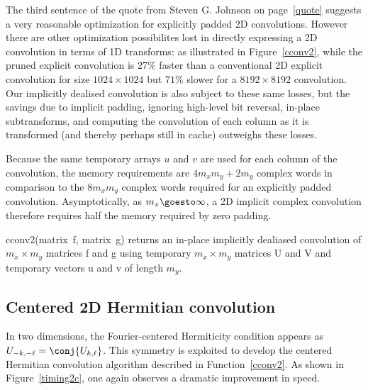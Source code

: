 \documentclass[final]{siamltex}
\begin{document}
The third sentence of the quote from Steven G. Johnson
on page~\ref{quote} suggests a very reasonable optimization
for explicitly padded 2D convolutions.
However there are other optimization possibilites lost in directly
expressing a 2D convolution in terms of 1D transforms: as illustrated in
Figure~\ref{cconv2}, while the pruned explicit convolution is 27\% faster
than a conventional 2D explicit convolution for size $1024\times 1024$ but
$71\%$ slower for a $8192\times 8192$ convolution. Our implicitly dealised
convolution is also subject to these same losses, but the savings due to
implicit padding, ignoring high-level bit reversal, in-place subtransforms, 
and computing the convolution of each column as it is transformed (and
thereby perhaps still in cache) outweighs these losses.

Because the same temporary arrays $u$ and $v$ are used for each column
of the convolution, the memory requirements are $4m_xm_y+2m_y$ complex
words in comparison to the $8m_xm_y$ complex words required for an
explicitly padded convolution. Asymptotically, as $m_x\goesto\infty$,
a 2D implicit complex convolution therefore requires half the memory
required by zero padding.


\begin{function}[htbp]
  \Return \xf\;
\caption{cconv2(matrix~{\sf f}, matrix~{\sf g}) 
returns an in-place implicitly dealiased convolution of
$m_x\times m_y$ matrices {\sf f} and {\sf g} using temporary $m_x\times m_y$
matrices {\sf U} and {\sf V} and temporary vectors {\sf u} and {\sf v} of
length $m_y$.}\label{cconv2}
\end{function}

\subsection{Centered 2D Hermitian convolution}

In two dimensions, the Fourier-centered Hermiticity condition appears as
$U_{-k,-\ell}=\conj{U_{k,\ell}}$. 
This symmetry is exploited to develop the centered Hermitian convolution
algorithm described in Function~\ref{cconv2}. As shown in
Figure~\ref{timing2c}, one again observes a dramatic improvement in speed.
\end{document}
